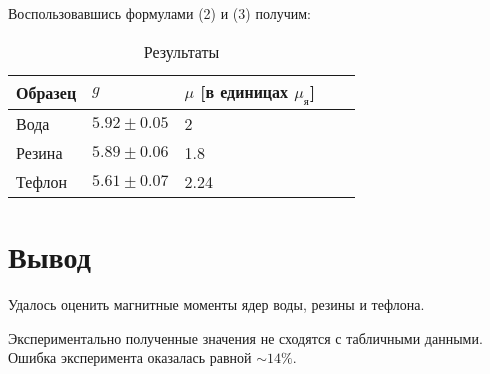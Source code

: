 \documentclass[a4paper, 14pt]{article}
\begin{document}
Воспользовавшись формулами (2) и (3) получим:

\begin{table}[hbtp]
    \begin{center}
    
    \begin{tabular}{|l|l|l|l|l|}
    \hline
    Образец & $g$  & $\mu$ [в единицах $\mu_{\text{я}}$]   \\ \hline
    Вода    & $5.92 \pm 0.05$    & 2          \\ \hline
    Резина  & $5.89 \pm 0.06$           & 1.8            \\ \hline
    Тефлон  & $5.61 \pm 0.07$          & 2.24            \\ \hline
    \end{tabular}
    \caption{Результаты}
    \label{table:end}
\end{center}
\end{table}


\section*{\textcolor{header}{Вывод}}

Удалось оценить магнитные моменты ядер воды, резины и тефлона. 

Экспериментально полученные значения не сходятся с табличными данными.
Ошибка эксперимента оказалась равной $\sim 14 \%$. 
\end{document}
